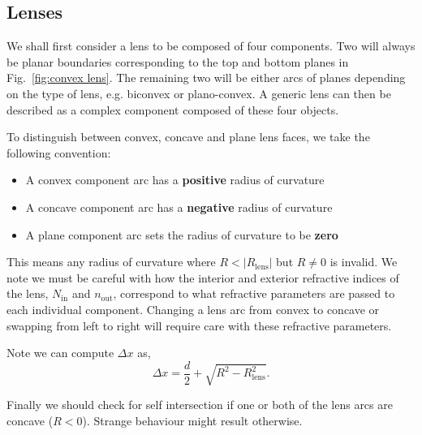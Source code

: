 \documentclass{article}
\begin{document}
\subsection{Lenses}
We shall first consider a lens to be composed of four components. Two will always be planar boundaries corresponding to the top and bottom planes in Fig.~\ref{fig:convex lens}. The remaining two will be either arcs of planes depending on the type of lens, e.g. biconvex or plano-convex. A generic lens can then be described as a complex component composed of these four objects.

To distinguish between convex, concave and plane lens faces, we take the following convention:
\begin{itemize}
    \item A convex component arc has a \textbf{positive} radius of curvature
    \item A concave component arc has a \textbf{negative} radius of curvature
    \item A plane component arc sets the radius of curvature to be \textbf{zero}
\end{itemize}
This means any radius of curvature where $R < |R_\mathrm{lens}|$ but $R \neq 0$ is invalid. We note we must be careful with how the interior and exterior refractive indices of the lens, $N_\mathrm{in}$ and $n_\mathrm{out}$, correspond to what refractive parameters are passed to each individual component. Changing
a lens arc from convex to concave or swapping from left to right will require care with these refractive parameters.

Note we can compute $\Delta x$ as,
\begin{equation}
    \Delta x = \frac{d}{2} + \sqrt{R^2 - R_\mathrm{lens}^2}.
\end{equation}

Finally we should check for self intersection if one or both of the lens arcs are concave ($R<0$). Strange behaviour might result otherwise.
\end{document}
